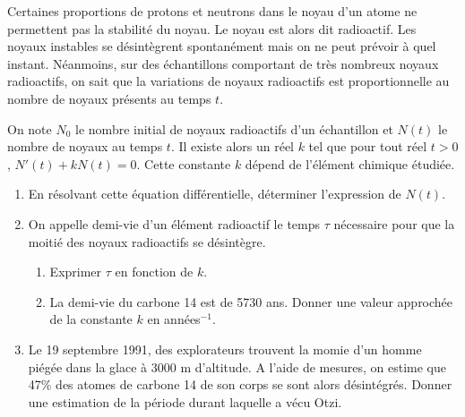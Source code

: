 \documentclass[11pt,fleqn, openany]{book} %
\begin{document}
\begin{exercise}[subtitle={(Datation au carbone 14)}] Certaines proportions de protons et neutrons dans le noyau d'un atome ne permettent pas la stabilité du noyau. Le noyau est alors dit radioactif. Les noyaux instables se désintègrent spontanément mais on ne peut prévoir à quel instant. Néanmoins, sur des échantillons comportant de très nombreux noyaux radioactifs, on sait que la variations de noyaux radioactifs est proportionnelle au nombre de noyaux présents au temps $t$. 

On note $N_0$ le nombre initial de noyaux radioactifs d'un échantillon et $N(t)$ le nombre de noyaux au temps $t$. Il existe alors un réel $k$ tel que pour tout réel $t>0$, $N'(t)+kN(t)=0$. Cette constante $k$ dépend de l'élément chimique étudiée.

\begin{enumerate}
\item En résolvant cette équation différentielle, déterminer l'expression de $N(t)$.
\item On appelle demi-vie d'un élément radioactif le temps $\tau$ nécessaire pour que la moitié des noyaux radioactifs se désintègre.
\begin{enumerate}
\item Exprimer $\tau$ en fonction de $k$.
\item La demi-vie du carbone 14 est de 5730 ans. Donner une valeur approchée de la constante $k$ en années$^{-1}$.
\end{enumerate}
\item Le 19 septembre 1991, des explorateurs trouvent la momie d'un homme piégée dans la glace à 3000 m d'altitude. A l'aide de mesures, on estime que 47\% des atomes de carbone 14 de son corps se sont alors désintégrés. Donner une estimation de la période durant laquelle a vécu Otzi.
\end{enumerate}\end{exercise}
\end{document}
